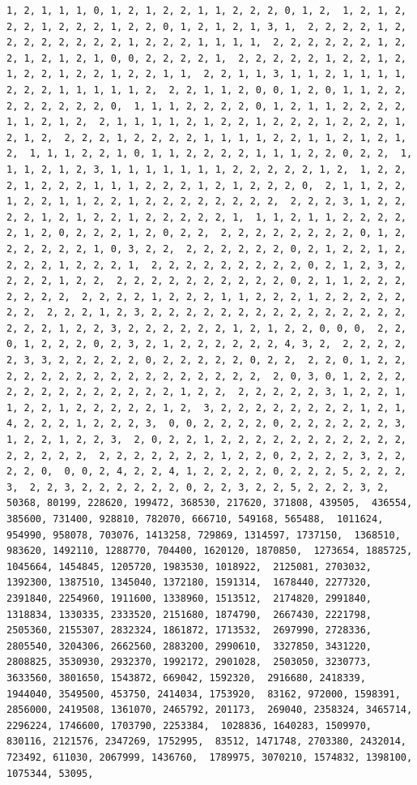 \documentclass[
]{article}
\begin{document}
\begin{verbatim}
1, 2, 1, 1, 1, 0, 1, 2, 1, 2, 2, 1, 1, 2, 2, 2, 0, 1, 2,  1, 2, 1, 2, 2, 2, 1, 2, 2, 2, 1, 2, 2, 0, 1, 2, 1, 2, 1, 3, 1,  2, 2, 2, 2, 1, 2, 2, 2, 2, 2, 2, 2, 2, 1, 2, 2, 2, 1, 1, 1, 1,  2, 2, 2, 2, 2, 2, 1, 2, 2, 1, 2, 1, 2, 1, 0, 0, 2, 2, 2, 2, 1,  2, 2, 2, 2, 2, 1, 2, 2, 1, 2, 1, 2, 2, 1, 2, 2, 1, 2, 2, 1, 1,  2, 2, 1, 1, 3, 1, 1, 2, 1, 1, 1, 1, 2, 2, 2, 1, 1, 1, 1, 1, 2,  2, 2, 1, 1, 2, 0, 0, 1, 2, 0, 1, 1, 2, 2, 2, 2, 2, 2, 2, 2, 0,  1, 1, 1, 2, 2, 2, 2, 0, 1, 2, 1, 1, 2, 2, 2, 2, 1, 1, 2, 1, 2,  2, 1, 1, 1, 1, 2, 1, 2, 2, 1, 2, 2, 2, 1, 2, 2, 2, 1, 2, 1, 2,  2, 2, 2, 1, 2, 2, 2, 2, 1, 1, 1, 1, 2, 2, 1, 1, 2, 1, 2, 1, 2,  1, 1, 1, 2, 2, 1, 0, 1, 1, 2, 2, 2, 2, 1, 1, 1, 2, 2, 0, 2, 2,  1, 1, 1, 2, 1, 2, 3, 1, 1, 1, 1, 1, 1, 1, 2, 2, 2, 2, 2, 1, 2,  1, 2, 2, 2, 1, 2, 2, 2, 1, 1, 1, 2, 2, 2, 1, 2, 1, 2, 2, 2, 0,  2, 1, 1, 2, 2, 1, 2, 2, 1, 1, 2, 2, 1, 2, 2, 2, 2, 2, 2, 2, 2,  2, 2, 2, 3, 1, 2, 2, 2, 2, 1, 2, 1, 2, 2, 1, 2, 2, 2, 2, 2, 1,  1, 1, 2, 1, 1, 2, 2, 2, 2, 2, 1, 2, 0, 2, 2, 2, 1, 2, 0, 2, 2,  2, 2, 2, 2, 2, 2, 2, 2, 0, 1, 2, 2, 2, 2, 2, 2, 1, 0, 3, 2, 2,  2, 2, 2, 2, 2, 2, 0, 2, 1, 2, 2, 1, 2, 2, 2, 2, 1, 2, 2, 2, 1,  2, 2, 2, 2, 2, 2, 2, 2, 2, 0, 2, 1, 2, 3, 2, 2, 2, 2, 1, 2, 2,  2, 2, 2, 2, 2, 2, 2, 2, 2, 2, 0, 2, 1, 1, 2, 2, 2, 2, 2, 2, 2,  2, 2, 2, 2, 1, 2, 2, 2, 1, 1, 2, 2, 2, 1, 2, 2, 2, 2, 2, 2, 2,  2, 2, 2, 1, 2, 3, 2, 2, 2, 2, 2, 2, 2, 2, 2, 2, 2, 2, 2, 2, 2,  2, 2, 2, 1, 2, 2, 3, 2, 2, 2, 2, 2, 2, 1, 2, 1, 2, 2, 0, 0, 0,  2, 2, 0, 1, 2, 2, 2, 0, 2, 3, 2, 1, 2, 2, 2, 2, 2, 2, 4, 3, 2,  2, 2, 2, 2, 2, 3, 3, 2, 2, 2, 2, 2, 0, 2, 2, 2, 2, 2, 0, 2, 2,  2, 2, 0, 1, 2, 2, 2, 2, 2, 2, 2, 2, 2, 2, 2, 2, 2, 2, 2, 2, 2,  2, 0, 3, 0, 1, 2, 2, 2, 2, 2, 2, 2, 2, 2, 2, 2, 2, 2, 1, 2, 2,  2, 2, 2, 2, 2, 3, 1, 2, 2, 1, 1, 2, 2, 1, 2, 2, 2, 2, 2, 1, 2,  3, 2, 2, 2, 2, 2, 2, 2, 2, 1, 2, 1, 4, 2, 2, 2, 1, 2, 2, 2, 3,  0, 0, 2, 2, 2, 2, 0, 2, 2, 2, 2, 2, 2, 3, 1, 2, 2, 1, 2, 2, 3,  2, 0, 2, 2, 1, 2, 2, 2, 2, 2, 2, 2, 2, 2, 2, 2, 2, 2, 2, 2, 2,  2, 2, 2, 2, 2, 2, 2, 1, 2, 2, 0, 2, 2, 2, 2, 3, 2, 2, 2, 2, 0,  0, 0, 2, 4, 2, 2, 4, 1, 2, 2, 2, 2, 0, 2, 2, 2, 5, 2, 2, 2, 3,  2, 2, 3, 2, 2, 2, 2, 2, 2, 0, 2, 2, 3, 2, 2, 5, 2, 2, 2, 3, 2,  50368, 80199, 228620, 199472, 368530, 217620, 371808, 439505,  436554, 385600, 731400, 928810, 782070, 666710, 549168, 565488,  1011624, 954990, 958078, 703076, 1413258, 729869, 1314597, 1737150,  1368510, 983620, 1492110, 1288770, 704400, 1620120, 1870850,  1273654, 1885725, 1045664, 1454845, 1205720, 1983530, 1018922,  2125081, 2703032, 1392300, 1387510, 1345040, 1372180, 1591314,  1678440, 2277320, 2391840, 2254960, 1911600, 1338960, 1513512,  2174820, 2991840, 1318834, 1330335, 2333520, 2151680, 1874790,  2667430, 2221798, 2505360, 2155307, 2832324, 1861872, 1713532,  2697990, 2728336, 2805540, 3204306, 2662560, 2883200, 2990610,  3327850, 3431220, 2808825, 3530930, 2932370, 1992172, 2901028,  2503050, 3230773, 3633560, 3801650, 1543872, 669042, 1592320,  2916680, 2418339, 1944040, 3549500, 453750, 2414034, 1753920,  83162, 972000, 1598391, 2856000, 2419508, 1361070, 2465792, 201173,  269040, 2358324, 3465714, 2296224, 1746600, 1703790, 2253384,  1028836, 1640283, 1509970, 830116, 2121576, 2347269, 1752995,  83512, 1471748, 2703380, 2432014, 723492, 611030, 2067999, 1436760,  1789975, 3070210, 1574832, 1398100, 1075344, 53095, 
\end{verbatim}
\end{document}
